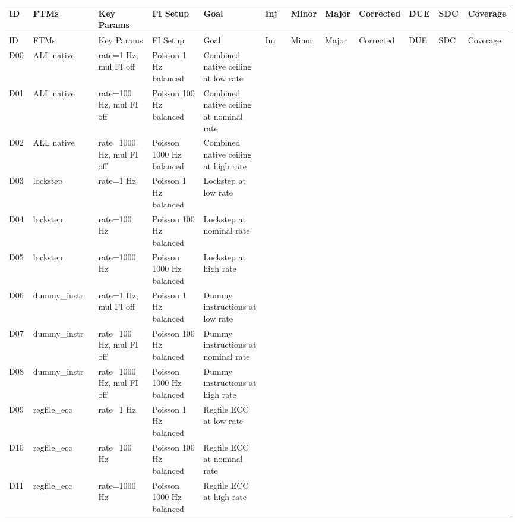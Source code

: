 \begin{longtable}{|p{0.05\linewidth}|p{0.14\linewidth}|p{0.12\linewidth}|p{0.12\linewidth}|p{0.14\linewidth}|p{0.06\linewidth}|p{0.06\linewidth}|p{0.06\linewidth}|p{0.06\linewidth}|p{0.06\linewidth}|p{0.06\linewidth}|p{0.06\linewidth}|}
\hline
ID & FTMs & Key Params & FI Setup & Goal & Inj & Minor & Major & Corrected & DUE & SDC & Coverage \\
\hline
\endfirsthead
\hline
ID & FTMs & Key Params & FI Setup & Goal & Inj & Minor & Major & Corrected & DUE & SDC & Coverage \\
\hline
\endhead
D00 & ALL native & rate=1 Hz, mul FI off & Poisson 1 Hz \textbar{} balanced & Combined native ceiling at low rate &  &  &  &  &  &  &  \\
\hline
D01 & ALL native & rate=100 Hz, mul FI off & Poisson 100 Hz \textbar{} balanced & Combined native ceiling at nominal rate &  &  &  &  &  &  &  \\
\hline
D02 & ALL native & rate=1000 Hz, mul FI off & Poisson 1000 Hz \textbar{} balanced & Combined native ceiling at high rate &  &  &  &  &  &  &  \\
\hline
D03 & lockstep & rate=1 Hz & Poisson 1 Hz \textbar{} balanced & Lockstep at low rate &  &  &  &  &  &  &  \\
\hline
D04 & lockstep & rate=100 Hz & Poisson 100 Hz \textbar{} balanced & Lockstep at nominal rate &  &  &  &  &  &  &  \\
\hline
D05 & lockstep & rate=1000 Hz & Poisson 1000 Hz \textbar{} balanced & Lockstep at high rate &  &  &  &  &  &  &  \\
\hline
D06 & dummy\_instr & rate=1 Hz, mul FI off & Poisson 1 Hz \textbar{} balanced & Dummy instructions at low rate &  &  &  &  &  &  &  \\
\hline
D07 & dummy\_instr & rate=100 Hz, mul FI off & Poisson 100 Hz \textbar{} balanced & Dummy instructions at nominal rate &  &  &  &  &  &  &  \\
\hline
D08 & dummy\_instr & rate=1000 Hz, mul FI off & Poisson 1000 Hz \textbar{} balanced & Dummy instructions at high rate &  &  &  &  &  &  &  \\
\hline
D09 & regfile\_ecc & rate=1 Hz & Poisson 1 Hz \textbar{} balanced & Regfile ECC at low rate &  &  &  &  &  &  &  \\
\hline
D10 & regfile\_ecc & rate=100 Hz & Poisson 100 Hz \textbar{} balanced & Regfile ECC at nominal rate &  &  &  &  &  &  &  \\
\hline
D11 & regfile\_ecc & rate=1000 Hz & Poisson 1000 Hz \textbar{} balanced & Regfile ECC at high rate &  &  &  &  &  &  &  \\

\end{longtable}
